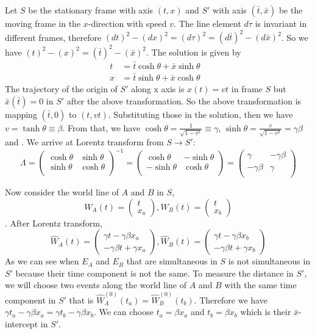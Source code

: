 \documentclass[12pt]{article}
\begin{document}
Let $S$ be the stationary frame with axis $(t, x)$ and $S'$ with axis $(\bar{t}, \bar{x})$ be the moving frame in the $x$-direction with speed $v$. The line element $d\tau$ is invariant in different frames, therefore $(dt)^2 - (dx)^2 = (d\tau)^2 = (d\bar{t})^2 - (d\bar{x})^2$. So we have $(t)^2 - (x)^2 = (\bar{t})^2 - (\bar{x})^2$. The solution is given by $$
 \begin{aligned}
 	t &= \bar{t}\cosh \theta + \bar{x} \sinh\theta   & \\
 	x &= \bar{t}\sinh \theta + \bar{x} \cosh\theta   & 
 \end{aligned}
$$
The trajectory of the origin of $S'$ along x axis is $x(t) = vt$ in frame $S$ but $\bar{x}(\bar{t}) = 0$ in $S'$ after the above transformation. So the above transformation is mapping $(\bar{t}, 0)$ to $(t, vt)$. Substituting those in the solution, then we have $v = \tanh\theta \equiv \beta$. From that, we have $\cosh \theta = \frac{1}{\sqrt{1 - v^2}} \equiv \gamma$, $\sinh\theta = \frac{v}{\sqrt{1 - v^2}} = \gamma\beta$ and . We arrive at Lorentz transform from $S \rightarrow S'$: $$\Lambda = \begin{pmatrix}
	\cosh\theta & \sinh\theta \\
	\sinh\theta & \cosh\theta \\ 
\end{pmatrix}^{-1}
= \begin{pmatrix}
	\cosh\theta & - \sinh\theta \\
	-\sinh\theta & \cosh\theta \\ 
\end{pmatrix}
= \begin{pmatrix}
	\gamma & -\gamma\beta \\
	-\gamma \beta & \gamma \\
\end{pmatrix}
$$

Now consider the world line of $A$ and $B$ in $S$,  
$$W_A(t) = \begin{pmatrix}
	t \\ x_a
\end{pmatrix},  
W_B(t) =  \begin{pmatrix}
t \\  x_b
\end{pmatrix}$$. After Lorentz transform, $$
\widehat{W}_A(t) = \begin{pmatrix}
 \gamma t - \gamma \beta x_a \\
 - \gamma\beta t + \gamma x_a
\end{pmatrix},
\widehat{W}_B(t) = \begin{pmatrix}
	\gamma t - \gamma \beta x_b \\
	- \gamma\beta t + \gamma x_b
\end{pmatrix}
$$
As we can see when $E_A$ and $E_B$ that are simultaneous in $S$ is not simultaneous in $S'$ because their time component is not the same. To measure the distance in $S'$, we will choose two events along the world line of $A$ and $B$ with the same time component in $S'$ that is $\widehat{W}_A^{(0)}(t_a) = \widehat{W}_B^{(0)}(t_b)$. Therefore we have $\gamma t_a  -  \gamma\beta x_a = \gamma t_b - \gamma \beta x_b$. We can choose $t_a = \beta x_a$ and $t_b = \beta x_b$ which is their  $\bar{x}$-intercept in $S'$.
\end{document}
